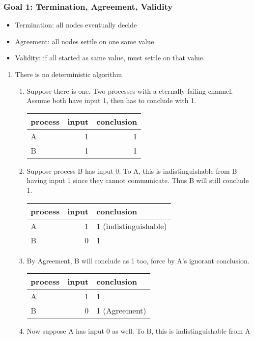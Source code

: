 \documentclass[11pt]{article}
\begin{document}
\subsubsection{Goal 1: Termination, Agreement, Validity}
\label{sec:org9747602}
\begin{itemize}
\item Termination: all nodes eventually decide
\item Agreement: all nodes settle on one same value
\item Validity: if all started as same value, must settle on that value.
\end{itemize}
\begin{enumerate}
\item There is no deterministic algorithm
\label{sec:org6ae4feb}
\begin{enumerate}
\item Suppose there is one. Two processes with a eternally failing channel. Assume
both have input 1, then has to conclude with 1.
\begin{center}
\begin{tabular}{lrr}
process & input & conclusion\\
\hline
A & 1 & 1\\
B & 1 & 1\\
\end{tabular}
\end{center}
\item Suppose process B has input 0. To A, this is indistinguishable from B having
input 1 since they cannot communicate. Thus B will still conclude 1.
\begin{center}
\begin{tabular}{lrl}
process & input & conclusion\\
\hline
A & 1 & 1 (indistinguishable)\\
B & 0 & 1\\
\end{tabular}
\end{center}
\item By Agreement, B will conclude as 1 too, force by A's ignorant conclusion.
\begin{center}
\begin{tabular}{lrl}
process & input & conclusion\\
\hline
A & 1 & 1\\
B & 0 & 1 (Agreement)\\
\end{tabular}
\end{center}
\item Now suppose A has input 0 as well. To B, this is indistinguishable from A

\end{enumerate}
\end{enumerate}
\end{document}
